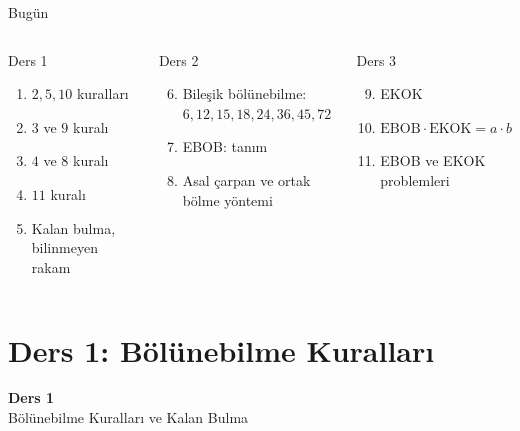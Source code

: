 \documentclass[aspectratio=169,11pt]{beamer}
\begin{document}
\begin{frame}{Bugün}
\begin{columns}[t]
\begin{block}{Ders 1}
\begin{enumerate}
\item \(2,5,10\) kuralları
\item \(3\) ve \(9\) kuralı
\item \(4\) ve \(8\) kuralı
\item \(11\) kuralı
\item Kalan bulma, bilinmeyen rakam
\end{enumerate}
\end{block}
\begin{block}{Ders 2}
\begin{enumerate}\setcounter{enumi}{5}
\item Bileşik bölünebilme: \(6,12,15,18,24,36,45,72\)
\item EBOB: tanım
\item Asal çarpan ve ortak bölme yöntemi
\end{enumerate}
\end{block}
\begin{block}{Ders 3}
\begin{enumerate}\setcounter{enumi}{8}
\item EKOK
\item \(\text{EBOB}\cdot\text{EKOK}=a\cdot b\)
\item EBOB ve EKOK problemleri
\end{enumerate}
\end{block}
\end{columns}
\end{frame}

\section{Ders 1: Bölünebilme Kuralları}
\begin{frame}
\centering\Large\color{anamavi}\textbf{Ders 1}\\[6pt]\normalsize Bölünebilme Kuralları ve Kalan Bulma
\end{frame}
\end{document}
